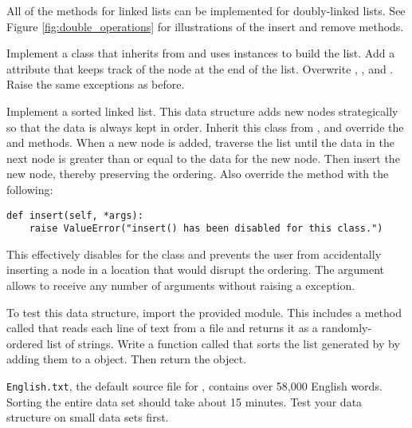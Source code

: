 All of the methods for linked lists can be implemented for doubly-linked lists.
See Figure \ref{fig:double_operations} for illustrations of the insert and remove methods.

\begin{problem}
Implement a  class that inherits from  and uses  instances to build the list.
Add a  attribute that keeps track of the node at the end of the list.
Overwrite , , and .
Raise the same exceptions as before.
\end{problem}

\begin{problem}
Implement a sorted linked list.
This data structure adds new nodes strategically so that the data is always kept in order.
Inherit this class from , and override the  and  methods.
When a new node is added, traverse the list until the data in the next node is greater than or equal to the data for the new node.
Then insert the new node, thereby preserving the ordering.
Also override the  method with the following:

\begin{lstlisting}
def insert(self, *args):
	raise ValueError("insert() has been disabled for this class.")
\end{lstlisting}

This effectively disables  for the  class and prevents the user from accidentally inserting a node in a location that would disrupt the ordering.
The  argument allows  to receive any number of arguments without raising a  exception.

To test this data structure, import the provided  module.
This includes a method called  that reads each line of text from a file and returns it as a randomly-ordered list of strings.
Write a function called  that sorts the list generated by  by adding them to a  object.
Then return the object.

\begin{warn}
\texttt{English.txt}, the default source file for , contains over 58,000 English words.
Sorting the entire data set should take about 15 minutes.
Test your data structure on small data sets first.
\end{warn}
\end{problem}

